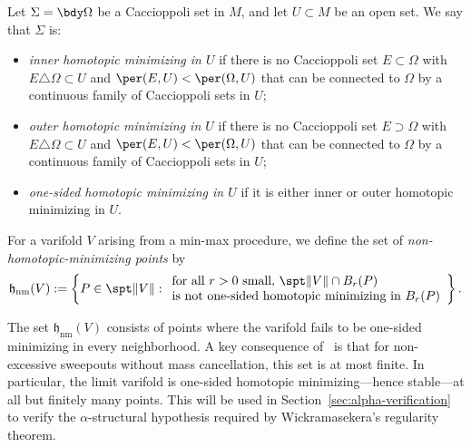 \begin{definition}\label{def:homotopic-minimizer}
Let $\Sigma = \bdy\Omega$ be a Caccioppoli set in $M$, and let $U \subset M$ be an open set. We say
that $\Sigma$ is:
\begin{itemize}
    \item \emph{inner homotopic minimizing in $U$} if there is no Caccioppoli set $E \subset \Omega$
    with $E \triangle \Omega \subset U$ and $\per(E, U) < \per(\Omega, U)$ that can be connected to
    $\Omega$ by a continuous family of Caccioppoli sets in $U$;
    \item \emph{outer homotopic minimizing in $U$} if there is no Caccioppoli set $E \supset \Omega$
    with $E \triangle \Omega \subset U$ and $\per(E, U) < \per(\Omega, U)$ that can be connected to
    $\Omega$ by a continuous family of Caccioppoli sets in $U$;
    \item \emph{one-sided homotopic minimizing in $U$} if it is either inner or outer homotopic
    minimizing in $U$.
\end{itemize}
\end{definition}

\begin{definition}\label{def:hnm}
For a varifold $V$ arising from a min-max procedure, we define the set of \emph{non-homotopic-minimizing
points} by
\[
    \mathfrak{h}_{\mathrm{nm}}(V) := \left\{P \in \spt\|V\| : \begin{array}{l}
        \text{for all $r > 0$ small, $\spt\|V\| \cap B_r(P)$} \\
        \text{is not one-sided homotopic minimizing in $B_r(P)$}
    \end{array}\right\}.
\]
\end{definition}

The set $\mathfrak{h}_{\mathrm{nm}}(V)$ consists of points where the varifold fails to be one-sided minimizing in every neighborhood. A key consequence of~\cite[Proposition~3.1]{CLS22} is that for non-excessive sweepouts without mass cancellation, this set is at most finite. In particular, the limit varifold is one-sided homotopic minimizing---hence stable---at all but finitely many points. This will be used in Section~\ref{sec:alpha-verification} to verify the $\alpha$-structural hypothesis required by Wickramasekera's regularity theorem.
